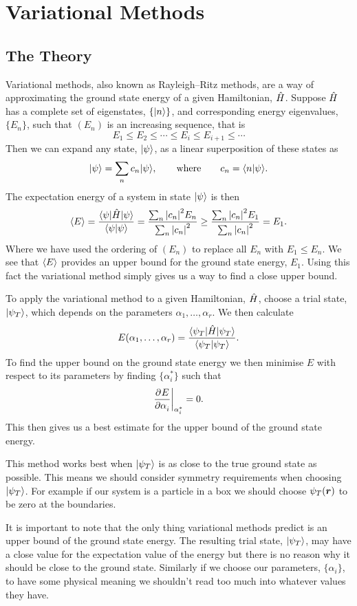     \section{Variational Methods}
    \subsection{The Theory}
    Variational methods, also known as Rayleigh--Ritz methods, are a way of approximating the ground state energy of a given Hamiltonian, \(\hat{H}\).
    Suppose \(\hat{H}\) has a complete set of eigenstates, \(\{\vert {n} \rangle\}\), and corresponding energy eigenvalues, \(\{E_n\}\), such that \((E_n)\) is an increasing sequence, that is
    \[E_1 \le E_2 \le \dotsb \le E_{i} \le E_{i + 1} \le \dotsb\]
    Then we can expand any state, \(\vert {\psi} \rangle\), as a linear superposition of these states as
    \[\vert {\psi} \rangle = \sum_n c_n\vert {\psi} \rangle, \qquad\text{where}\qquad c_n = \langle {n} \vert {\psi} \rangle.\]
    The expectation energy of a system in state \(\vert {\psi} \rangle\) is then
    \[\langle{E}\rangle = \frac{\langle {\psi} \vert\hat{H}\vert {\psi} \rangle}{\langle {\psi} \vert {\psi} \rangle} = \frac{\sum_n\abs{c_n}^2E_n}{\sum_n \abs{c_n}^2} \ge \frac{\sum_n \abs{c_n}^2 E_1}{\sum_n \abs{c_n}^2} = E_1.\]
    Where we have used the ordering of \((E_n)\) to replace all \(E_n\) with \(E_1 \le E_n\).
    We see that \(\langle{E}\rangle\) provides an upper bound for the ground state energy, \(E_1\).
    Using this fact the variational method simply gives us a way to find a close upper bound.
    
    To apply the variational method to a given Hamiltonian, \(\hat{H}\), choose a trial state, \(\vert {\psi_T} \rangle\), which depends on the parameters \(\alpha_1, \dotsc, \alpha_r\).
    We then calculate
    \[E(\alpha_1, \dotsc, \alpha_r) = \frac{\langle {\psi_T} \vert\hat{H}\vert {\psi_T} \rangle}{\langle {\psi_T} \vert {\psi_T} \rangle}.\]
    To find the upper bound on the ground state energy we then minimise \(E\) with respect to its parameters by finding \(\{\alpha_i^*\}\) such that
    \[\pdv[]{E}{\alpha_i}\biggr|_{\alpha_i^*} = 0.\]
    This then gives us a best estimate for the upper bound of the ground state energy.
    
    This method works best when \(\vert {\psi_T} \rangle\) is as close to the true ground state as possible.
    This means we should consider symmetry requirements when choosing \(\vert {\psi_T} \rangle\).
    For example if our system is a particle in a box we should choose \(\psi_T(\bm{r})\) to be zero at the boundaries.
    
    It is important to note that the only thing variational methods predict is an upper bound of the ground state energy.
    The resulting trial state, \(\vert {\psi_T} \rangle\), may have a close value for the expectation value of the energy but there is no reason why it should be close to the ground state.
    Similarly if we choose our parameters, \(\{\alpha_i\}\), to have some physical meaning we shouldn't read too much into whatever values they have.
    
